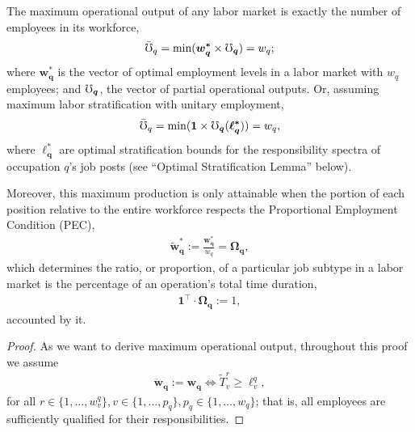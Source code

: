 \documentclass[hidelinks, nonatbib]{elsarticle}
\begin{document}
\begin{lemma}
    The maximum operational output of any labor market is exactly the number of employees in its workforce,
    \begin{gather}
        \bar{\mho}_{q}
        =
        \min(
            \boldsymbol{w_{q}^{*}}
            \times
            \boldsymbol{\mho_q}
        )
        = w_q
        ;
    \end{gather}
    where $\boldsymbol{w_{q}^{*}}$ is the vector of optimal employment levels in a labor market with $w_q$ employees; and $\boldsymbol{\mho_q}$, the vector of partial operational outputs. Or, assuming maximum labor stratification with unitary employment,
    \begin{gather}
        \bar{\mho}_{q}
        =
        \min(
            \boldsymbol{1}
            \times
            \boldsymbol{\mho_q}(
                \boldsymbol{\ell_{q}^{*}}
            )
        )
        = w_q
        ,
    \end{gather}
    where $\boldsymbol{\ell_{q}^{*}}$ are optimal stratification bounds for the responsibility spectra of occupation $q$'s job posts (see ``Optimal Stratification Lemma'' below).
    
    Moreover, this maximum production is only attainable when the portion of each position relative to the entire workforce respects the Proportional Employment Condition (PEC),
    \begin{gather}
        \boldsymbol{\tilde{w}_{q}^{*}}
        :=
        \frac{
            \boldsymbol{w_{q}^{*}}
        }{
            w_q
        }
        =
        \boldsymbol{\Omega_{q}}
        ,
    \end{gather}
    which determines the ratio, or proportion, of a particular job subtype in a labor market is the percentage of an operation's total time duration,
    \begin{gather}
        \boldsymbol{1} ^ {\top}
        \cdot
        \boldsymbol{\Omega_{q}}
        := 1
        ,
    \end{gather}
    accounted by it.
    
    \begin{proof}
        As we want to derive maximum operational output, throughout this proof we assume
        \begin{gather}
            \boldsymbol{\ddot{w}_{q}}
            :=
            \boldsymbol{w_q}
            \iff
            \tilde{T}_{v}^{r}
            \geq
            \ell_{v}^{q}
            ,
        \end{gather}
        for all $
        r \in \{1, \dots, w_{v}^{q}\}
        ,
        v \in \{1, \dots, p_q\}
        ,
        p_q \in \{1, \dots, w_q\}
        $; that is, all employees are sufficiently qualified for their responsibilities.
        

\end{proof}
\end{lemma}
\end{document}
